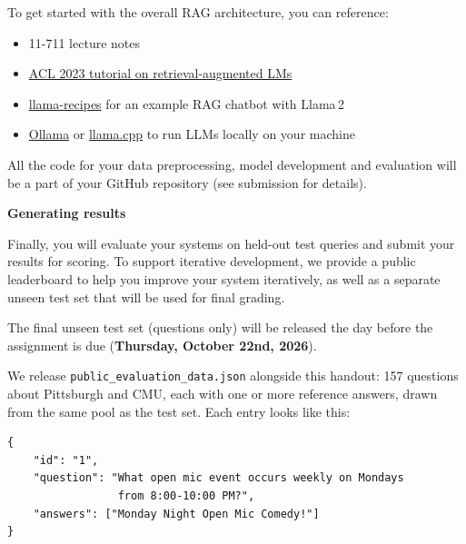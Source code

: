 \documentclass[11pt]{article}
\newcommand{\problem}[1]{%
  \vspace{1em}
  \noindent\colorbox{headerblue}{\parbox{\dimexpr\textwidth-2\fboxsep}{%
    \vspace{2pt}\textbf{\large #1}\vspace{2pt}}}
  \vspace{0.6em}
}
\newcommand{\subsec}[1]{%
  \vspace{0.8em}
  \noindent{\sffamily\bfseries\color{mauve} #1}
  \vspace{0.35em}
  \par
}
\begin{document}
\vspace{0.5em}
\noindent To get started with the overall RAG architecture, you can reference:

\begin{itemize}[nosep, leftmargin=2em]
  \item 11-711 lecture notes
  \item \href{https://acl2023-retrieval-lm.github.io}{ACL 2023 tutorial on retrieval-augmented LMs}
  \item \href{https://github.com/facebookresearch/llama-recipes/tree/main/demo_apps/RAG_Chatbot_example}{llama-recipes}
    for an example RAG chatbot with Llama\,2
  \item \href{https://github.com/ollama/ollama}{Ollama} or
    \href{https://github.com/ggerganov/llama.cpp}{llama.cpp} to run LLMs locally on your machine
\end{itemize}

\noindent All the code for your data preprocessing, model development and evaluation will be a part of
your GitHub repository (see submission for details).

\problem{Generating results}

\noindent Finally, you will evaluate your systems on held-out test queries and submit your results for
scoring. To support iterative development, we provide a public leaderboard to help you improve your
system iteratively, as well as a separate unseen test set that will be used for final grading.

\vspace{0.5em}
\noindent The final unseen test set (questions only) will be released the day before the assignment is
due (\textbf{Thursday, October 22nd, 2026}).

\subsec{Public evaluation data}

\noindent We release \texttt{public\_evaluation\_data.json} alongside this handout: 157 questions
about Pittsburgh and CMU, each with one or more reference answers, drawn from the same pool as the
test set. Each entry looks like this:

\begin{codebox}
\begin{verbatim}
{
    "id": "1",
    "question": "What open mic event occurs weekly on Mondays
                 from 8:00-10:00 PM?",
    "answers": ["Monday Night Open Mic Comedy!"]
}
\end{verbatim}
\end{codebox}
\end{document}
